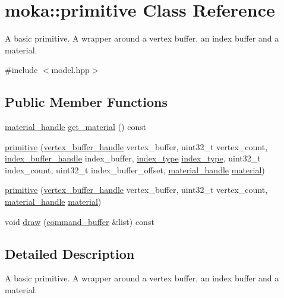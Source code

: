 \hypertarget{classmoka_1_1primitive}{}\section{moka\+::primitive Class Reference}
\label{classmoka_1_1primitive}


A basic primitive. A wrapper around a vertex buffer, an index buffer and a material.  




{\ttfamily \#include $<$model.\+hpp$>$}

\subsection*{Public Member Functions}
\begin{DoxyCompactItemize}
\item 
\mbox{\hyperlink{structmoka_1_1material__handle}{material\+\_\+handle}} \mbox{\hyperlink{classmoka_1_1primitive_a0cd9192d639d8ff180016c7102361440}{get\+\_\+material}} () const
\item 
\mbox{\hyperlink{classmoka_1_1primitive_a1ca8472d19dae33ca651f90b66639812}{primitive}} (\mbox{\hyperlink{structmoka_1_1vertex__buffer__handle}{vertex\+\_\+buffer\+\_\+handle}} vertex\+\_\+buffer, uint32\+\_\+t vertex\+\_\+count, \mbox{\hyperlink{structmoka_1_1index__buffer__handle}{index\+\_\+buffer\+\_\+handle}} index\+\_\+buffer, \mbox{\hyperlink{namespacemoka_a32244b0de63481283738e2db11639e3f}{index\+\_\+type}} \mbox{\hyperlink{namespacemoka_a32244b0de63481283738e2db11639e3f}{index\+\_\+type}}, uint32\+\_\+t index\+\_\+count, uint32\+\_\+t index\+\_\+buffer\+\_\+offset, \mbox{\hyperlink{structmoka_1_1material__handle}{material\+\_\+handle}} \mbox{\hyperlink{classmoka_1_1material}{material}})
\item 
\mbox{\hyperlink{classmoka_1_1primitive_a72056e3a435f7d2044ec523348cf875d}{primitive}} (\mbox{\hyperlink{structmoka_1_1vertex__buffer__handle}{vertex\+\_\+buffer\+\_\+handle}} vertex\+\_\+buffer, uint32\+\_\+t vertex\+\_\+count, \mbox{\hyperlink{structmoka_1_1material__handle}{material\+\_\+handle}} \mbox{\hyperlink{classmoka_1_1material}{material}})
\item 
void \mbox{\hyperlink{classmoka_1_1primitive_aed9c45c5844f61180db3500ae4fd8cf6}{draw}} (\mbox{\hyperlink{classmoka_1_1command__buffer}{command\+\_\+buffer}} \&list) const
\end{DoxyCompactItemize}


\subsection{Detailed Description}
A basic primitive. A wrapper around a vertex buffer, an index buffer and a material. 

